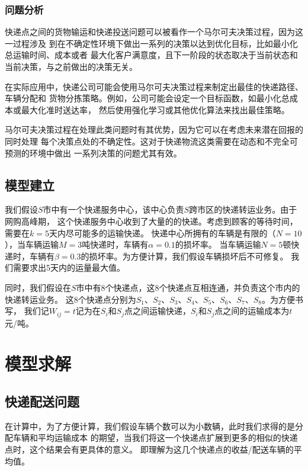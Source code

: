 \documentclass[UTF8]{ctexart}
\begin{document}
\subsubsection{问题分析}

快递点之间的货物输运和快递投送问题可以被看作一个马尔可夫决策过程，因为这一过程涉及
到在不确定性环境下做出一系列的决策以达到优化目标，比如最小化总运输时间、成本或者
最大化客户满意度，且下一阶段的状态取决于当前状态和当前决策，与之前做出的决策无关。

在实际应用中，快递公司可能会使用马尔可夫决策过程来制定出最佳的快递路径、车辆分配和
货物分拣策略。例如，公司可能会设定一个目标函数，如最小化总成本或最大化准时送达率，
然后使用强化学习或其他优化算法来找出最佳策略。

马尔可夫决策过程在处理此类问题时有其优势，因为它可以在考虑未来潜在回报的同时处理
每个决策点处的不确定性。这对于快递物流这类需要在动态和不完全可预测的环境中做出
一系列决策的问题尤其有效。

\subsection{模型建立}

我们假设$S$市中有一个快递服务中心，该中心负责$S$跨市区的快递转运业务。由于网购高峰期，
这个快递服务中心收到了大量的的快递。考虑到顾客的等待时间，需要在$k=5$天内尽可能多的运输快递。
快递中心所拥有的车辆是有限的（$N=10$），当车辆运输$M=3$吨快递时，车辆有$\alpha=0.1$的损坏率。
当车辆运输$N=5$顿快递时，车辆有$\beta=0.3$的损坏率。为方便计算，我们假设车辆损坏后不可修复。
我们需要求出5天内的运量最大值。

同时，我们假设在$S$市中有8个快递点，这8个快递点互相连通，并负责这个市内的快递转运业务。
这8个快递点分别为$S_1$、$S_2$、$S_3$、$S_4$、$S_5$、$S_6$、$S_7$、$S_8$。为方便书写，
我们记$W_{ij}=t$记为在$S_i$和$S_j$点之间运输快递，$S_i$和$S_j$点之间的运输成本为$t$元/吨。

\section{模型求解}

\subsection{快递配送问题}

在计算中，为了方便计算，我们假设车辆个数可以为小数辆，此时我们求得的是分配车辆和平均运输成本
的期望，当我们将这一个快递点扩展到更多的相似的快递点时，这个结果会有更具体的意义。
即理解为这几个快递点的收益/配送车辆的平均值。
\end{document}
